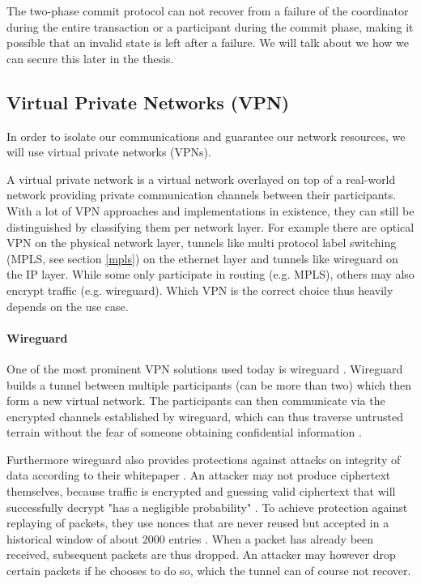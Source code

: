 The two-phase commit protocol can not recover from a failure of the coordinator during the entire transaction or a participant during the commit phase, making it possible that an invalid state is left after a failure. We will talk about we how we can secure this later in the thesis.


\subsection{Virtual Private Networks (VPN)}
In order to isolate our communications and guarantee our network resources, we will use virtual private networks (VPNs).

A virtual private network \cite{vpn} is a virtual network overlayed on top of a real-world network providing private communication channels between their participants. With a lot of VPN approaches and implementations in existence, they can still be distinguished by classifying them per network layer. For example there are optical VPN on the physical network layer, tunnels like multi protocol label switching (MPLS, see section \ref{mpls}) on the ethernet layer and tunnels like wireguard \cite{wireguard} on the IP layer. While some only participate in routing (e.g. MPLS), others may also encrypt traffic (e.g. wireguard). Which VPN is the correct choice thus heavily depends on the use case.

\paragraph{Wireguard} One of the most prominent VPN solutions used today is wireguard \cite{wireguard}. Wireguard builds a tunnel between multiple participants (can be more than two) which then form a new virtual network. The participants can then communicate via the encrypted channels established by wireguard, which can thus traverse untrusted terrain without the fear of someone obtaining confidential information \cite{wireguard}.

Furthermore wireguard also provides protections against attacks on integrity of data according to their whitepaper \cite{wireguard}. An attacker may not produce ciphertext themselves, because traffic is encrypted and guessing valid ciphertext that will successfully decrypt "has a negligible probability" \cite{wireguardcrypto}. To achieve protection against replaying of packets, they use nonces that are never reused but accepted in a historical window of about 2000 entries \cite{wireguardproto}. When a packet has already been received, subsequent packets are thus dropped. An attacker may however drop certain packets if he chooses to do so, which the tunnel can of course not recover.

